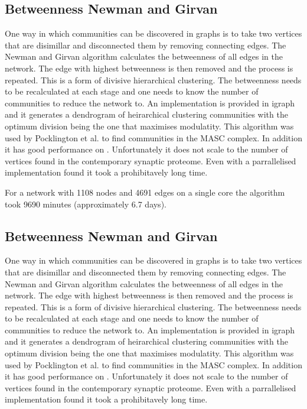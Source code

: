 \subsection{Betweenness Newman and Girvan}
One way in which communities can be discovered in graphs is to take two vertices that are
disimillar and disconnected them by removing connecting edges.
The Newman and Girvan algorithm \cite{newman2004finding}  calculates the betweenness
of all edges in the network. The edge with highest betweenness is then removed and the
process is repeated. This is a form of divisive hierarchical clustering. The betweenness
needs to be recalculated at each stage and one needs to know the number of communities
to reduce the network to. An implementation is provided in igraph and it generates a dendrogram of heirarchical clustering communities with the optimum division being the one that maximises modulatity. This algorithm was used by Pocklington et al. \cite{pocklington2006proteomes} to find
communities in the MASC complex. In addition it has good performance on . Unfortunately it does not scale to the number of
vertices found in the contemporary synaptic proteome. Even with a parrallelised implementation found it took a prohibitavely long time. 

For a network with 1108 nodes and 4691 edges on a single core the algorithm took 9690 minutes (approximately 6.7 days). \cite{mclean2016improved}


\subsection{Betweenness Newman and Girvan}
One way in which communities can be discovered in graphs is to take two vertices that are
disimillar and disconnected them by removing connecting edges.
The Newman and Girvan algorithm \cite{newman2004finding}  calculates the betweenness
of all edges in the network. The edge with highest betweenness is then removed and the
process is repeated. This is a form of divisive hierarchical clustering. The betweenness
needs to be recalculated at each stage and one needs to know the number of communities
to reduce the network to. An implementation is provided in igraph and it generates a dendrogram of heirarchical clustering communities with the optimum division being the one that maximises modulatity. This algorithm was used by Pocklington et al. \cite{pocklington2006proteomes} to find
communities in the MASC complex. In addition it has good performance on . Unfortunately it does not scale to the number of
vertices found in the contemporary synaptic proteome. Even with a parrallelised implementation found it took a prohibitavely long time. 

